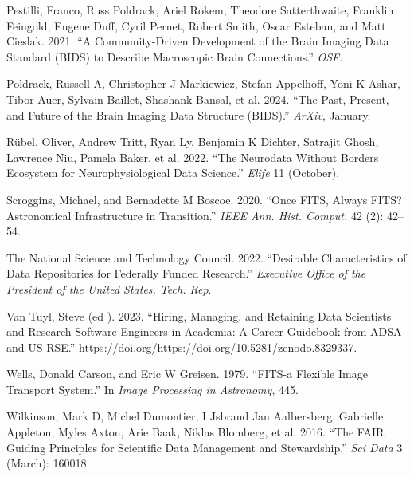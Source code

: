 \documentclass[
  letterpaper,
  DIV=11,
  numbers=noendperiod]{scrartcl}
\newlength{\cslhangindent}
\newenvironment{CSLReferences}[2] %
 {\begin{list}{}{%
  \setlength{\itemindent}{0pt}
  \setlength{\leftmargin}{0pt}
  \setlength{\parsep}{0pt}
  \ifodd #1
   \setlength{\leftmargin}{\cslhangindent}
   \setlength{\itemindent}{-1\cslhangindent}
  \fi
  \setlength{\itemsep}{#2\baselineskip}}}
 {\end{list}}
\begin{document}
\begin{CSLReferences}{1}{0}
Pestilli, Franco, Russ Poldrack, Ariel Rokem, Theodore Satterthwaite,
Franklin Feingold, Eugene Duff, Cyril Pernet, Robert Smith, Oscar
Esteban, and Matt Cieslak. 2021. {``A Community-Driven Development of
the Brain Imaging Data Standard (BIDS) to Describe Macroscopic Brain
Connections.''} \emph{OSF}.

Poldrack, Russell A, Christopher J Markiewicz, Stefan Appelhoff, Yoni K
Ashar, Tibor Auer, Sylvain Baillet, Shashank Bansal, et al. 2024. {``The
Past, Present, and Future of the Brain Imaging Data Structure
({BIDS}).''} \emph{ArXiv}, January.

Rübel, Oliver, Andrew Tritt, Ryan Ly, Benjamin K Dichter, Satrajit
Ghosh, Lawrence Niu, Pamela Baker, et al. 2022. {``The Neurodata Without
Borders Ecosystem for Neurophysiological Data Science.''} \emph{Elife}
11 (October).

Scroggins, Michael, and Bernadette M Boscoe. 2020. {``Once {FITS},
Always {FITS}? Astronomical Infrastructure in Transition.''} \emph{IEEE
Ann. Hist. Comput.} 42 (2): 42--54.

The National Science and Technology Council. 2022. {``Desirable
Characteristics of Data Repositories for Federally Funded Research.''}
\emph{Executive Office of the President of the United States, Tech.
Rep}.

Van Tuyl, Steve (ed ). 2023. {``Hiring, Managing, and Retaining Data
Scientists and Research Software Engineers in Academia: A Career
Guidebook from {ADSA} and {US}-{RSE}.''}
https://doi.org/\url{https://doi.org/10.5281/zenodo.8329337}.

Wells, Donald Carson, and Eric W Greisen. 1979. {``FITS-a Flexible Image
Transport System.''} In \emph{Image Processing in Astronomy}, 445.

Wilkinson, Mark D, Michel Dumontier, I Jsbrand Jan Aalbersberg,
Gabrielle Appleton, Myles Axton, Arie Baak, Niklas Blomberg, et al.
2016. {``The {FAIR} Guiding Principles for Scientific Data Management
and Stewardship.''} \emph{Sci Data} 3 (March): 160018.

\end{CSLReferences}
\end{document}
